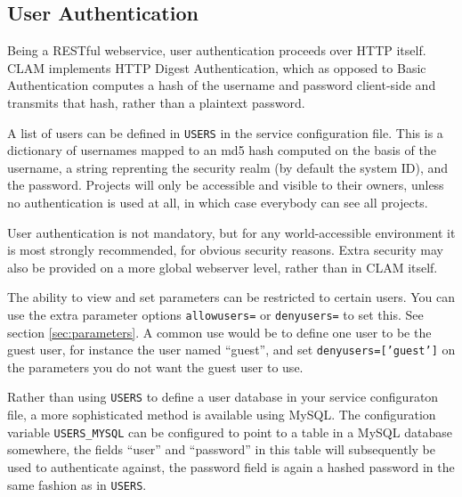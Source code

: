 \documentclass[a4paper,12pt]{report}
\begin{document}
\subsection{User Authentication}

Being a RESTful webservice, user authentication proceeds over HTTP itself. CLAM implements HTTP Digest Authentication, which as opposed to Basic Authentication computes a hash of the username and password client-side and transmits that hash, rather than a plaintext password. 

A list of users can be defined in \texttt{USERS} in the service configuration file. This is a dictionary of usernames mapped to an md5 hash computed on the basis of the username, a string reprenting the security realm (by default the system ID), and the password. Projects will only be accessible and visible to their owners, unless no authentication is used at all, in which case everybody can see all projects.



User authentication is not mandatory, but for any world-accessible environment it is most strongly recommended, for obvious security reasons. Extra security may also be provided on a more global webserver level, rather than in CLAM itself.

The ability to view and set parameters can be restricted to certain users. You can use the extra parameter options \texttt{allowusers=} or \texttt{denyusers=} to set this. See section \ref{sec:parameters}. A common use would be to define one user to be the guest user, for instance the user named ``guest'', and set \texttt{denyusers=['guest']} on the parameters you do not want the guest user to use.

Rather than using \texttt{USERS} to define a user database in your service configuraton file, a more sophisticated method is available using MySQL. The configuration variable \texttt{USERS\_MYSQL} can be configured to point to a table in a MySQL database somewhere, the fields ``user'' and ``password'' in this table will subsequently be used to authenticate against, the password field is again a hashed password in the same fashion as in \texttt{USERS}.
\end{document}
